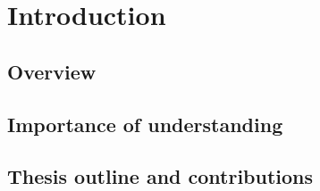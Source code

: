 \chapter{Introduction}
\section{Overview}
\section{Importance of understanding}
\section{Thesis outline and contributions}






\iffalse
\section*{Biological Motivation}
\section*{Real Life Applications}
\section*{Black Box representation}
\section{The Perceptron model}
\section{Importance of understanding}
\section{Visualization}
\fi